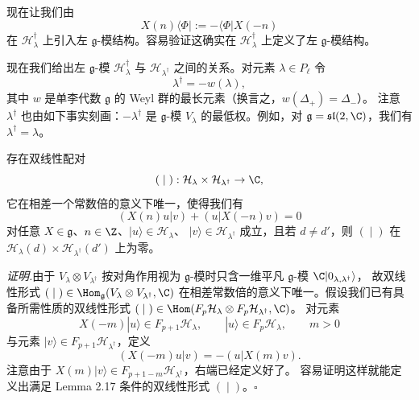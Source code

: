 现在让我们由
\[
X(n)\langle\Phi|:=-\langle\Phi|X(-n)
\]
在 $\mathcal{H}^{\dagger}_{\lambda}$ 上引入左 $\mathfrak{g}$-模结构。容易验证这确实在
$\mathcal{H}^{\dagger}_{\lambda}$ 上定义了左 $\mathfrak{g}$-模结构。

现在我们给出左 $\mathfrak{g}$-模 $\mathcal{H}^{\dagger}_{\lambda}$ 与
$\mathcal{H}_{\lambda^{\dagger}}$ 之间的关系。对元素 $\lambda\in P_{\ell}$ 令
\[
\lambda^{\dagger}=-w(\lambda),
\]
其中 $w$ 是单李代数 $\mathfrak{g}$ 的 Weyl 群的最长元素（换言之，$w(\Delta_+)=\Delta_-$）。
注意 $\lambda^{\dagger}$ 也由如下事实刻画：$-\lambda^{\dagger}$ 是 $\mathfrak{g}$-模
$V_{\lambda}$ 的最低权。例如，对 $\mathfrak{g}=\mathfrak{sl}(2,\C)$，我们有
$\lambda^{\dagger}=\lambda$。

\begin{lemma}[2.17]
存在双线性配对
\[
(\;|\;):\mathcal{H}_{\lambda}\times\mathcal{H}_{\lambda^{\dagger}}\to\C,
\]
它在相差一个常数倍的意义下唯一，使得我们有
\[
(X(n)u|v)+(u|X(-n)v)=0
\]
对任意 $X\in\mathfrak{g}$、$n\in\Z$、$|u\rangle\in\mathcal{H}_{\lambda}$、
$|v\rangle\in\mathcal{H}_{\lambda^{\dagger}}$ 成立，且若 $d\ne d'$，则
$(\;|\;)$ 在 $\mathcal{H}_{\lambda}(d)\times\mathcal{H}_{\lambda^{\dagger}}(d')$ 上为零。
\end{lemma}


\noindent\textit{证明.}\quad 由于 $V_{\lambda}\otimes V_{\lambda^{\dagger}}$ 按对角作用视为
$\mathfrak{g}$-模时只含一维平凡 $\mathfrak{g}$-模 $\C|0_{\lambda,\lambda^{\dagger}}\rangle$，
故双线性形式 $(\;|\;)\in\Hom_{\mathfrak{g}}(V_{\lambda}\otimes V_{\lambda^{\dagger}},\C)$
在相差常数倍的意义下唯一。假设我们已有具备所需性质的双线性形式
$(\;|\;)\in\Hom(F_p\mathcal{H}_{\lambda}\otimes F_p\mathcal{H}_{\lambda^{\dagger}},\C)$。
对元素
\[
X(-m)|u\rangle\in F_{p+1}\mathcal{H}_{\lambda},\qquad
|u\rangle\in F_p\mathcal{H}_{\lambda},\qquad m>0
\]
与元素 $|v\rangle\in F_{p+1}\mathcal{H}_{\lambda^{\dagger}}$，定义
\begin{equation}
(X(-m)u|v)=-(u|X(m)v). \tag{2.27}
\end{equation}
注意由于 $X(m)|v\rangle\in F_{p+1-m}\mathcal{H}_{\lambda^{\dagger}}$，右端已经定义好了。
容易证明这样就能定义出满足 Lemma 2.17 条件的双线性形式 $(\;|\;)$。\hfill$\square$

